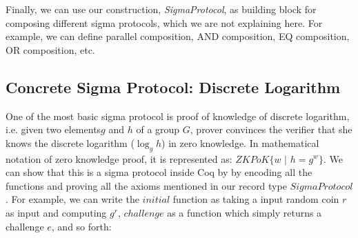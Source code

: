 %
%
%
%
%
%
%
%
%
%

%

Finally, we can use our construction, \textit{SigmaProtocol}, as building block 
for composing different sigma protocols, which we are not explaining 
here.  For example, 
we can define parallel composition, AND composition,
EQ composition, OR composition, etc.

\subsection{Concrete Sigma Protocol: Discrete Logarithm}
\label{sec:conc_sigma}
One of the most basic sigma protocol is proof of knowledge of 
discrete logarithm, i.e. given two elements$g$ and $h$ of 
a group $G$, prover convinces the verifier that 
she knows the discrete logarithm ($\log_g h$) in zero 
knowledge. In mathematical 
notation of zero knowledge proof, it is represented as:
$ZKPoK \lbrace w \text{ | } h = g^w \rbrace$. We can show 
that this is a sigma protocol inside Coq by 
by encoding all the  functions 
and proving all the axioms mentioned in 
our record type $SigmaProtocol$.  For example,
 we can write the $initial$ function as taking a input 
random coin $r$ as input and computing 
$g^r$, $challenge$ as a function which simply returns 
a challenge $e$, and so forth: 


